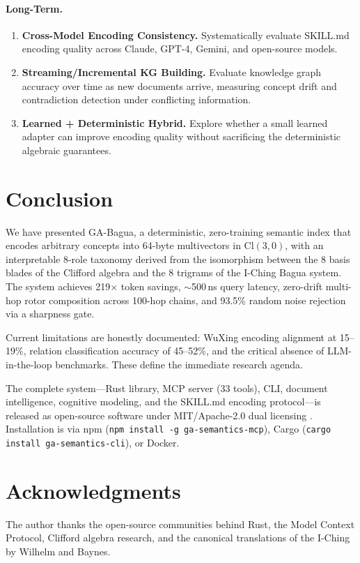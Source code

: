 \documentclass[11pt,a4paper]{article}
\newcommand{\Cl}{\mathrm{Cl}}
\begin{document}
\paragraph{Long-Term.}
\begin{enumerate}[nosep]
\item \textbf{Cross-Model Encoding Consistency.} Systematically evaluate
  SKILL.md encoding quality across Claude, GPT-4, Gemini, and open-source
  models.
\item \textbf{Streaming/Incremental KG Building.} Evaluate knowledge graph
  accuracy over time as new documents arrive, measuring concept drift and
  contradiction detection under conflicting information.
\item \textbf{Learned + Deterministic Hybrid.} Explore whether a small learned
  adapter can improve encoding quality without sacrificing the deterministic
  algebraic guarantees.
\end{enumerate}

\section{Conclusion}

We have presented GA-Bagua, a deterministic, zero-training semantic index that
encodes arbitrary concepts into 64-byte multivectors in $\Cl(3,0)$, with an
interpretable 8-role taxonomy derived from the isomorphism between the 8 basis
blades of the Clifford algebra and the 8 trigrams of the I-Ching Bagua
system. The system achieves 219$\times$ token savings, $\sim$500\,ns query
latency, zero-drift multi-hop rotor composition across 100-hop chains, and
93.5\% random noise rejection via a sharpness gate.

Current limitations are honestly documented: WuXing encoding alignment at
15--19\%, relation classification accuracy of 45--52\%, and the critical
absence of LLM-in-the-loop benchmarks. These define the immediate research
agenda.

The complete system---Rust library, MCP server (33 tools), CLI, document
intelligence, cognitive modeling, and the SKILL.md encoding protocol---is
released as open-source software under MIT/Apache-2.0 dual licensing
\cite{ga-bagua2026}. Installation is via npm (\texttt{npm install -g
ga-semantics-mcp}), Cargo (\texttt{cargo install ga-semantics-cli}), or
Docker.

\section*{Acknowledgments}

The author thanks the open-source communities behind Rust, the Model Context
Protocol, Clifford algebra research, and the canonical translations of the
I-Ching by Wilhelm and Baynes.



\end{document}

